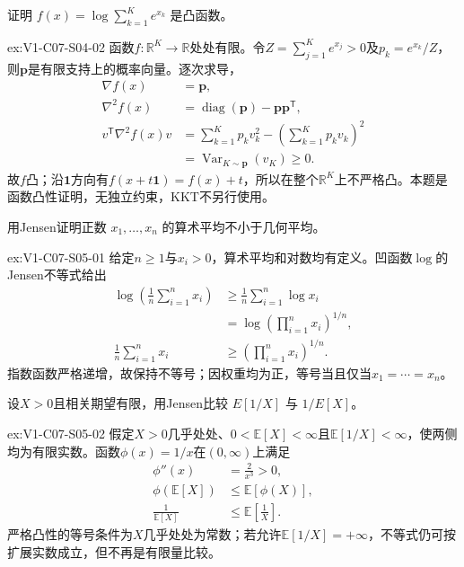 \begin{SLChapterExercisePairSection}
\begin{exercise}\label{ex:V1-C07-S04-02}
证明 $f(x)=\log\sum_{k=1}^{K}e^{x_k}$ 是凸函数。
\end{exercise}
\label{sol:V1-C07-S04-02}
\begin{chapterexercisesolution}{ex:V1-C07-S04-02}
函数$f:\mathbb R^K\to\mathbb R$处处有限。令$Z=\sum_{j=1}^Ke^{x_j}>0$及$p_k=e^{x_k}/Z$，则$\boldsymbol p$是有限支持上的概率向量。逐次求导，
\[
\begin{aligned}
\nabla f(x)&=\boldsymbol p,\\
\nabla^2f(x)&=\operatorname{diag}(\boldsymbol p)
-\boldsymbol p\boldsymbol p^{\mathsf T},\\
v^{\mathsf T}\nabla^2f(x)v
&=\sum_{k=1}^Kp_kv_k^2
-\left(\sum_{k=1}^Kp_kv_k\right)^2\\
&=\operatorname{Var}_{K\sim\boldsymbol p}(v_K)\ge0.
\end{aligned}
\]
故$f$凸；沿$\mathbf1$方向有$f(x+t\mathbf1)=f(x)+t$，所以在整个$\mathbb R^K$上不严格凸。本题是函数凸性证明，无独立约束，KKT不另行使用。
\end{chapterexercisesolution}

\begin{exercise}\label{ex:V1-C07-S05-01}
用Jensen证明正数 $x_1,\ldots,x_n$ 的算术平均不小于几何平均。
\end{exercise}
\label{sol:V1-C07-S05-01}
\begin{chapterexercisesolution}{ex:V1-C07-S05-01}
给定$n\ge1$与$x_i>0$，算术平均和对数均有定义。凹函数$\log$的Jensen不等式给出
\[
\begin{aligned}
\log\left(\frac1n\sum_{i=1}^nx_i\right)
&\ge\frac1n\sum_{i=1}^n\log x_i\\
&=\log\left(\prod_{i=1}^nx_i\right)^{1/n},\\
\frac1n\sum_{i=1}^nx_i
&\ge\left(\prod_{i=1}^nx_i\right)^{1/n}.
\end{aligned}
\]
指数函数严格递增，故保持不等号；因权重均为正，等号当且仅当$x_1=\cdots=x_n$。
\end{chapterexercisesolution}

\begin{exercise}\label{ex:V1-C07-S05-02}
设$X>0$且相关期望有限，用Jensen比较 $E[1/X]$ 与 $1/E[X]$。
\end{exercise}
\label{sol:V1-C07-S05-02}
\begin{chapterexercisesolution}{ex:V1-C07-S05-02}
假定$X>0$几乎处处、$0<\mathbb E[X]<\infty$且$\mathbb E[1/X]<\infty$，使两侧均为有限实数。函数$\phi(x)=1/x$在$(0,\infty)$上满足
\[
\begin{aligned}
\phi''(x)&=\frac2{x^3}>0,\\
\phi(\mathbb E[X])
&\le\mathbb E[\phi(X)],\\
\frac1{\mathbb E[X]}&\le\mathbb E\!\left[\frac1X\right].
\end{aligned}
\]
严格凸性的等号条件为$X$几乎处处为常数；若允许$\mathbb E[1/X]=+\infty$，不等式仍可按扩展实数成立，但不再是有限量比较。
\end{chapterexercisesolution}


\end{SLChapterExercisePairSection}
